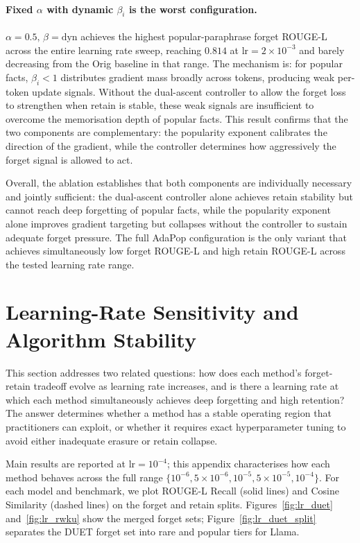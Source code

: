\paragraph{Fixed $\alpha$ with dynamic $\beta_i$ is the worst configuration.}
$\alpha{=}0.5,\,\beta{=}\text{dyn}$ achieves the highest popular-paraphrase forget ROUGE-L across the entire learning rate sweep, reaching $0.814$ at $\text{lr}{=}2\times10^{-3}$ and barely decreasing from the Orig baseline in that range. The mechanism is: for popular facts, $\beta_i{<}1$ distributes gradient mass broadly across tokens, producing weak per-token update signals. Without the dual-ascent controller to allow the forget loss to strengthen when retain is stable, these weak signals are insufficient to overcome the memorisation depth of popular facts. This result confirms that the two components are complementary: the popularity exponent calibrates the direction of the gradient, while the controller determines how aggressively the forget signal is allowed to act.

Overall, the ablation establishes that both components are individually necessary and jointly sufficient: the dual-ascent controller alone achieves retain stability but cannot reach deep forgetting of popular facts, while the popularity exponent alone improves gradient targeting but collapses without the controller to sustain adequate forget pressure. The full AdaPop configuration is the only variant that achieves simultaneously low forget ROUGE-L and high retain ROUGE-L across the tested learning rate range.

\section{Learning-Rate Sensitivity and Algorithm Stability}
\label{app:lr_sensitivity}

This section addresses two related questions: how does each method's forget-retain tradeoff evolve as learning rate increases, and is there a learning rate at which each method simultaneously achieves deep forgetting and high retention? The answer determines whether a method has a stable operating region that practitioners can exploit, or whether it requires exact hyperparameter tuning to avoid either inadequate erasure or retain collapse.

Main results are reported at $\text{lr}=10^{-4}$; this appendix characterises how each method behaves across the full range $\{10^{-6}, 5{\times}10^{-6}, 10^{-5}, 5{\times}10^{-5}, 10^{-4}\}$. For each model and benchmark, we plot ROUGE-L Recall (solid lines) and Cosine Similarity (dashed lines) on the forget and retain splits. Figures~\ref{fig:lr_duet} and~\ref{fig:lr_rwku} show the merged forget sets; Figure~\ref{fig:lr_duet_split} separates the DUET forget set into rare and popular tiers for Llama.

